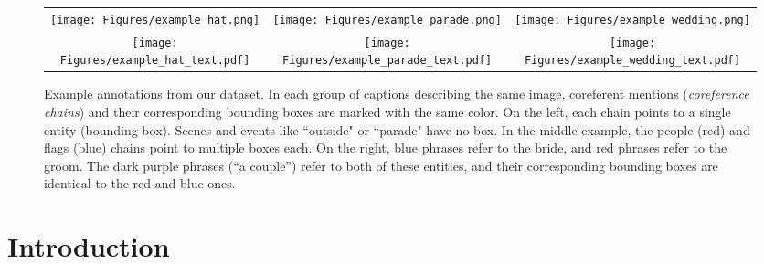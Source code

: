 \documentclass[twocolumn]{svjour3}
\begin{document}
\begin{figure*}[!tb]
\centering
\begin{tabular}[t]{ccc}
\texttt{[image: Figures/example\_hat.png]} \vspace{-3mm}& 
\texttt{[image: Figures/example\_parade.png]} &
\texttt{[image: Figures/example\_wedding.png]} \\ 
\texttt{[image: Figures/example\_hat\_text.pdf]}&
\texttt{[image: Figures/example\_parade\_text.pdf]}&
\texttt{[image: Figures/example\_wedding\_text.pdf]}\\
\end{tabular}
\caption{Example annotations from our dataset. In each group of captions describing the same image, coreferent mentions ({\em coreference chains}) and their corresponding bounding boxes are marked with the same color. On the left, each chain points to a single entity (bounding box). Scenes and events like ``outside" or ``parade" have no box. In the middle example, the people (red) and flags (blue) chains point to multiple boxes each. On the right,  blue phrases refer to the bride, and red phrases refer to the groom. The dark purple phrases (``a couple'') refer to both of these entities, and their corresponding bounding boxes are identical to the red and blue ones.}
\label{fig:Examples}
\end{figure*}


\section{Introduction}
\end{document}
